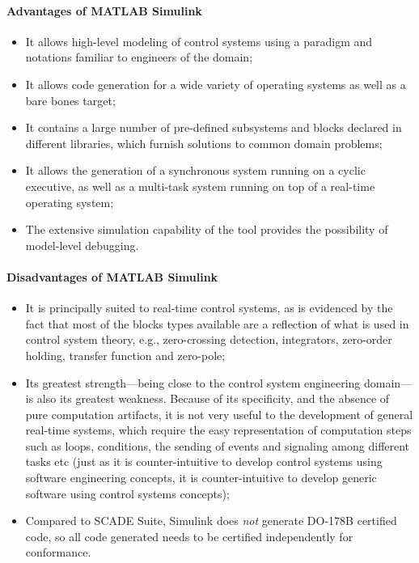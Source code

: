 \paragraph{Advantages of MATLAB Simulink}
\begin{itemize}
\item{It allows high-level modeling of control systems using a
  paradigm and notations familiar to engineers of the domain;}
\item{It allows code generation for a wide variety of operating
  systems as well as a bare bones target;}
\item{It contains a large number of pre-defined subsystems and blocks
  declared in different libraries, which furnish solutions to common
  domain problems;}
\item{It allows the generation of a synchronous system running on a
  cyclic executive, as well as a multi-task system running on top of a
  real-time operating system;}
\item{The extensive simulation capability of the tool provides the
  possibility of model-level debugging.}
\end{itemize}

\paragraph{Disadvantages of MATLAB Simulink}
\begin{itemize}
\item{It is principally suited to real-time control systems, as is
  evidenced by the fact that most of the blocks types available are a
  reflection of what is used in control system theory, e.g.,
  zero-crossing detection, integrators, zero-order holding, transfer
  function and zero-pole;}
\item{Its greatest strength---being close to the control system
  engineering domain---is also its greatest weakness. Because of its
  specificity, and the absence of pure computation artifacts, it is
  not very useful to the development of general real-time systems,
  which require the easy representation of computation steps such as
  loops, conditions, the sending of events and signaling among
  different tasks etc (just as it is counter-intuitive to develop
  control systems using software engineering concepts, it is
  counter-intuitive to develop generic software using control systems
  concepts);}
\item{Compared to SCADE Suite, Simulink does \emph{not} generate
  DO-178B certified code, so all code generated needs to be certified
  independently for conformance.}
\end{itemize}

